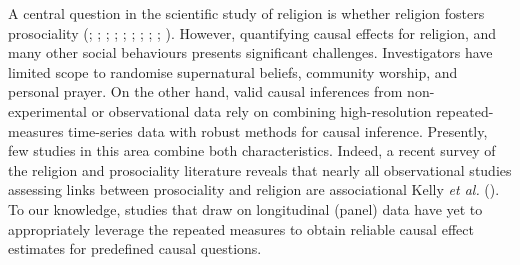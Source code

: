 \documentclass[
  single column]{article}
\begin{document}
A central question in the scientific study of religion is whether
religion fosters prosociality (; ;
;
;
;
; ; ;
;
). However,
quantifying causal effects for religion, and many other social
behaviours presents significant challenges. Investigators have limited
scope to randomise supernatural beliefs, community worship, and personal
prayer. On the other hand, valid causal inferences from non-experimental
or observational data rely on combining high-resolution
repeated-measures time-series data with robust methods for causal
inference. Presently, few studies in this area combine both
characteristics. Indeed, a recent survey of the religion and
prosociality literature reveals that nearly all observational studies
assessing links between prosociality and religion are associational
Kelly \emph{et al.} (). To our
knowledge, studies that draw on longitudinal (panel) data have yet to
appropriately leverage the repeated measures to obtain reliable causal
effect estimates for predefined causal questions.
\end{document}

